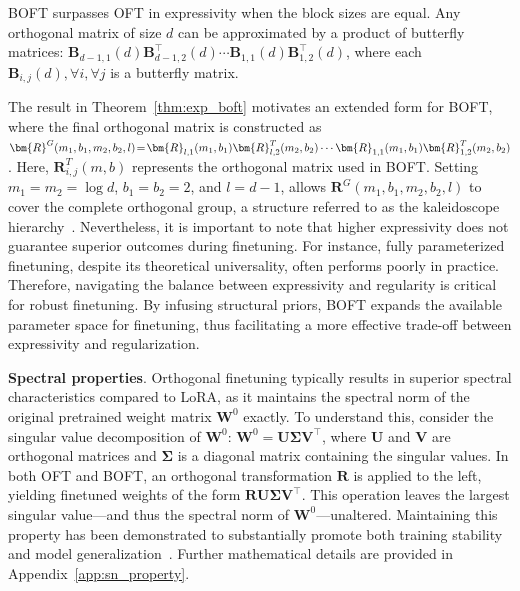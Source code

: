 \begin{theorem}\label{thm:exp_boft}
    BOFT surpasses OFT in expressivity when the block sizes are equal. Any orthogonal matrix of size $d$ can be approximated by a product of butterfly matrices: $\bm{B}_{d-1,1}(d)\bm{B}^\top_{d-1,2}(d)\cdots\bm{B}_{1,1}(d)\bm{B}^\top_{1,2}(d)$, where each $\bm{B}_{i,j}(d),\forall i,\forall j$ is a butterfly matrix.
\end{theorem}

The result in Theorem~\ref{thm:exp_boft} motivates an extended form for BOFT, where the final orthogonal matrix is constructed as $\thickmuskip=2mu \medmuskip=2mu \bm{R}^G(m_1,b_1,m_2,b_2,l)=\bm{R}_{l,1}(m_1,b_1)\bm{R}_{l,2}^T(m_2,b_2)\cdots\bm{R}_{1,1}(m_1,b_1)\bm{R}_{1,2}^T(m_2,b_2)$. Here, $\bm{R}_{i,j}^T(m,b)$ represents the orthogonal matrix used in BOFT. Setting $m_1=m_2=\log d$, $b_1=b_2=2$, and $l=d-1$, allows $\bm{R}^G(m_1,b_1,m_2,b_2,l)$ to cover the complete orthogonal group, a structure referred to as the kaleidoscope hierarchy~\cite{dao2019kaleidoscope}. Nevertheless, it is important to note that higher expressivity does not guarantee superior outcomes during finetuning. For instance, fully parameterized finetuning, despite its theoretical universality, often performs poorly in practice. Therefore, navigating the balance between expressivity and regularity is critical for robust finetuning. By infusing structural priors, BOFT expands the available parameter space for finetuning, thus facilitating a more effective trade-off between expressivity and regularization.

\textbf{Spectral properties}. Orthogonal finetuning typically results in superior spectral characteristics compared to LoRA, as it maintains the spectral norm of the original pretrained weight matrix $\bm{W}^0$ exactly. To understand this, consider the singular value decomposition of $\bm{W}^0$: $\bm{W}^0=\bm{U}\bm{\Sigma}\bm{V}^\top$, where $\bm{U}$ and $\bm{V}$ are orthogonal matrices and $\bm{\Sigma}$ is a diagonal matrix containing the singular values. In both OFT and BOFT, an orthogonal transformation $\bm{R}$ is applied to the left, yielding finetuned weights of the form $\bm{R}\bm{U}\bm{\Sigma}\bm{V}^\top$. This operation leaves the largest singular value—and thus the spectral norm of $\bm{W}^0$—unaltered. Maintaining this property has been demonstrated to substantially promote both training stability and model generalization~\cite{miyato2018spectral,yoshida2017spectral}. Further mathematical details are provided in Appendix~\ref{app:sn_property}.

